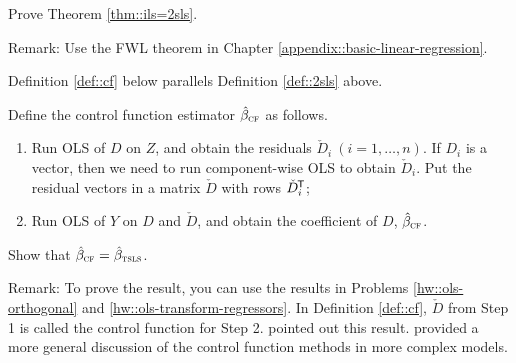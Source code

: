 \begin{HomeworkProblem}\label{exr:23-2}
Prove Theorem \ref{thm::ils=2sls}.


Remark: Use the FWL theorem in Chapter \ref{appendix::basic-linear-regression}.



\end{HomeworkProblem}

\begin{HomeworkProblem}\label{exr:23-3}

Definition \ref{def::cf} below parallels Definition \ref{def::2sls} above.

\begin{definition}
\label{def::cf}
Define the control function estimator $\hat{\beta}_\textsc{cf}$ as follows.
\begin{enumerate}
\item
Run OLS of $D$ on $Z$, and obtain the residuals $\check D_i\ (i=1,\ldots, n)$. If $D_i$ is a vector, then we need to run component-wise OLS to obtain $\check D_i$. Put the residual vectors in a matrix $\check{D}$ with rows $\check{D}_i^{\mkern-1.5mu\mathsf{T}} $;
\item
Run OLS of $Y$ on $D$ and $\check{D}$, and obtain the coefficient of $D$, $\hat{\beta}_\textsc{cf}$.
\end{enumerate}
\end{definition}

 Show that $\hat{\beta}_\textsc{cf} = \hat{\beta}_\textsc{tsls}$.


 Remark:
To prove the result, you can use the results in Problems \ref{hw::ols-orthogonal} and \ref{hw::ols-transform-regressors}.
  In Definition \ref{def::cf}, $\check{D}$ from Step 1 is called the control function for Step 2.
 \citet{hausman1978specification} pointed out this result. \citet{wooldridge2015control} provided a more general discussion of the control function methods in more complex models.






%
%
%
%
%


\end{HomeworkProblem}

